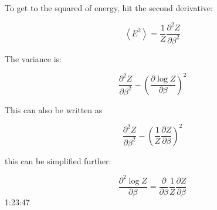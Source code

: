 \documentclass[a4, 12pt, english, USenglish]{scrreprt}
\newcommand{\abrackets}[1]{\ensuremath{\left<{#1}\right>}}
\newcommand{\parens}[1]{\ensuremath{\left({#1}\right)}}
\begin{document}
To get to the squared of energy, hit the second derivative:

\[
    \abrackets{E^2} = \frac{1}{Z} \frac{\partial^2 Z}{\partial\beta^2}
\]

The variance is:


\[
\frac{\partial^2 Z}{\partial\beta^2} - \parens{\frac{\partial\log Z}{\partial\beta}}^2
\]

This can also be written as

\[
\frac{\partial^2 Z}{\partial\beta^2}
- \parens{\frac{1}{Z}\frac{\partial Z}{\partial\beta}}^2
\]

this can be simplified further:

\[
\frac{\partial^2\log Z}{\partial\beta  } =
   \frac{\partial}{\partial\beta} \frac{1}{Z} \frac{\partial Z}{\partial\beta}
\]
1:23:47


\printindex
\end{document}
